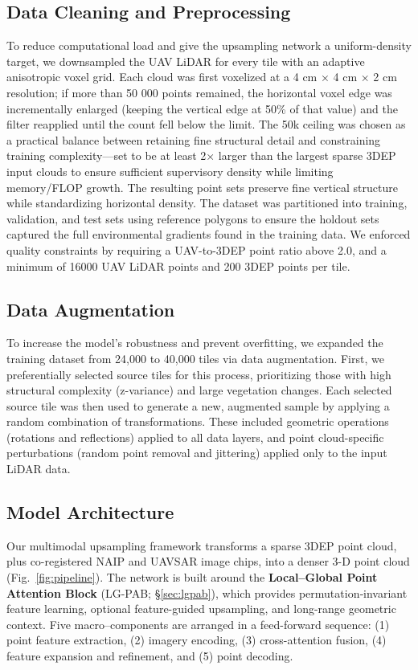 \documentclass[remotesensing,article,submit,pdftex,moreauthors]{Definitions/mdpi}
\begin{document}
\subsection{Data Cleaning and Preprocessing}
To reduce computational load and give the upsampling network a uniform-density target, we downsampled the UAV LiDAR for every tile with an adaptive anisotropic voxel grid. Each cloud was first voxelized at a 4 cm × 4 cm × 2 cm resolution; if more than 50 000 points remained, the horizontal voxel edge was incrementally enlarged (keeping the vertical edge at 50\% of that value) and the filter reapplied until the count fell below the limit. The 50k ceiling was chosen as a practical balance between retaining fine structural detail and constraining training complexity—set to be at least 2× larger than the largest sparse 3DEP input clouds to ensure sufficient supervisory density while limiting memory/FLOP growth. The resulting point sets preserve fine vertical structure while standardizing horizontal density. The dataset was partitioned into training, validation, and test sets using reference polygons to ensure the holdout sets captured the full environmental gradients found in the training data. We enforced quality constraints by requiring a UAV-to-3DEP point ratio above 2.0, and a minimum of 16000 UAV LiDAR points and 200 3DEP points per tile.

\subsection{Data Augmentation}
To increase the model's robustness and prevent overfitting, we expanded the training dataset from 24,000 to 40,000 tiles via data augmentation\cite{zhu2024advancements, shorten2019survey}. First, we preferentially selected source tiles for this process, prioritizing those with high structural complexity (z-variance) and large vegetation changes. Each selected source tile was then used to generate a new, augmented sample by applying a random combination of transformations. These included geometric operations (rotations and reflections) applied to all data layers, and point cloud-specific perturbations (random point removal and jittering) applied only to the input LiDAR data.


\subsection{Model Architecture}
\label{sec:architecture}
Our multimodal upsampling framework transforms a sparse 3DEP point cloud, plus co-registered NAIP and UAVSAR image chips, into a denser 3-D point cloud (Fig.~\ref{fig:pipeline}).
The network is built around the \textbf{Local–Global Point Attention Block} (LG-PAB; §\ref{sec:lgpab}), which provides permutation‐invariant feature learning, optional feature-guided upsampling, and long-range geometric context.
Five macro–components are arranged in a feed-forward sequence:
(1) point feature extraction, (2) imagery encoding, (3) cross-attention fusion, (4) feature expansion and refinement, and (5) point decoding.
\end{document}
